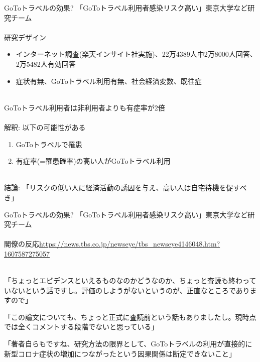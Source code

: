 \begin{frame}[t]{GoToトラベルの効果?}
「GoToトラベル利用者感染リスク高い」東京大学など研究チーム\\~\\
研究デザイン
\begin{itemize}
\vspace{1.0ex}\setlength{\itemsep}{1.0ex}\setlength{\baselineskip}{12pt}
\item	インターネット調査(楽天インサイト社実施)、22万4389人中2万8000人回答、2万5482人有効回答
\item	症状有無、GoToトラベル利用有無、社会経済変数、既往症\\~\\
\end{itemize}

\pause
GoToトラベル利用者は非利用者よりも有症率が2倍\\~\\
\pause
解釈: 以下の可能性がある
\begin{enumerate}
\vspace{1.0ex}\setlength{\itemsep}{1.0ex}\setlength{\baselineskip}{12pt}
\pause
\item	GoToトラベルで罹患
\pause
\item	有症率(=罹患確率)の高い人がGoToトラベル利用\\~\\
\end{enumerate}
\pause
結論: 「リスクの低い人に経済活動の誘因を与え、高い人は自宅待機を促すべき」
\end{frame}

\begin{frame}[t]{GoToトラベルの効果?}
「GoToトラベル利用者感染リスク高い」東京大学など研究チーム\\~\\
閣僚の反応{\scriptsize\url{https://news.tbs.co.jp/newseye/tbs_newseye4146048.htm?1607587275057}}\\~\\

\begin{description}
\vspace{1.0ex}\setlength{\itemsep}{1.0ex}\setlength{\baselineskip}{12pt}
\item[田村憲久厚労相]	「ちょっとエビデンスといえるものなのかどうなのか、ちょっと査読も終わっていないという話ですし。評価のしようがないというのが、正直なところでありますので」
\item[赤羽一嘉国交相]	「この論文についても、ちょっと正式に査読前という話もありましたし。現時点では全くコメントする段階でないと思っている」
\item[加藤勝信官房長官]	「著者自らもですね、研究方法の限界として、GoToトラベルの利用が直接的に新型コロナ症状の増加につながったという因果関係は断定できないこと」
\end{description}

\end{frame}

